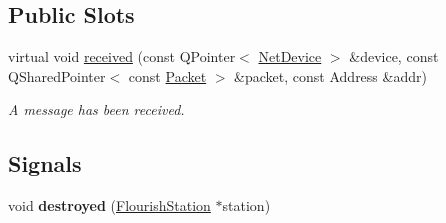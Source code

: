 \subsection*{Public Slots}
\begin{DoxyCompactItemize}
\item 
virtual void \hyperlink{classFlourishStation_a2f45c2c14fa88707e4af97d4d99b23bb}{received} (const Q\+Pointer$<$ \hyperlink{classNetDevice}{Net\+Device} $>$ \&device, const Q\+Shared\+Pointer$<$ const \hyperlink{classV2XMessage}{Packet} $>$ \&packet, const Address \&addr)
\begin{DoxyCompactList}\small\item\em A message has been received. \end{DoxyCompactList}\end{DoxyCompactItemize}
\subsection*{Signals}
\begin{DoxyCompactItemize}
\item 
void {\bfseries destroyed} (\hyperlink{classFlourishStation}{Flourish\+Station} $\ast$station)\hypertarget{classFlourishStation_ae56c849a7c45fcca35d7870f62dfa9bc}{}\label{classFlourishStation_ae56c849a7c45fcca35d7870f62dfa9bc}

\end{DoxyCompactItemize}

